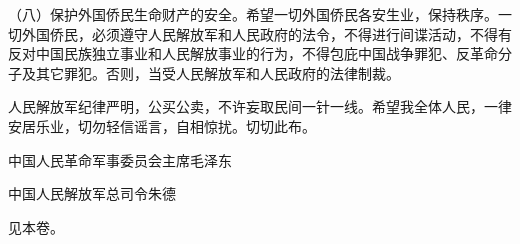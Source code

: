 （八）保护外国侨民生命财产的安全。希望一切外国侨民各安生业，保持秩序。一切外国侨民，必须遵守人民解放军和人民政府的法令，不得进行间谍活动，不得有反对中国民族独立事业和人民解放事业的行为，不得包庇中国战争罪犯、反革命分子及其它罪犯。否则，当受人民解放军和人民政府的法律制裁。

人民解放军纪律严明，公买公卖，不许妄取民间一针一线。希望我全体人民，一律安居乐业，切勿轻信谣言，自相惊扰。切切此布。

中国人民革命军事委员会主席毛泽东

中国人民解放军总司令朱德


\begin{maonote}
见本卷。
\end{maonote}
